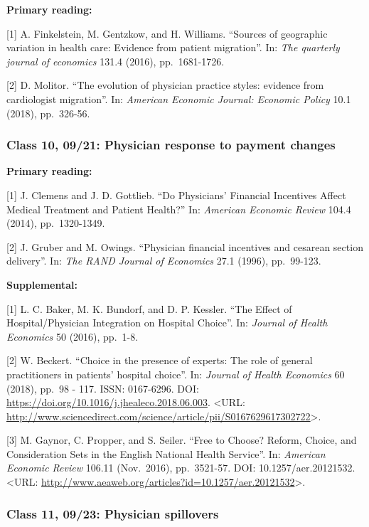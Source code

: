 \documentclass[11pt,]{article}
\begin{document}
\textbf{Primary reading:}

{[}1{]} A. Finkelstein, M. Gentzkow, and H. Williams. ``Sources of
geographic variation in health care: Evidence from patient migration''.
In: \emph{The quarterly journal of economics} 131.4 (2016),
pp.~1681-1726.

{[}2{]} D. Molitor. ``The evolution of physician practice styles:
evidence from cardiologist migration''. In: \emph{American Economic
Journal: Economic Policy} 10.1 (2018), pp.~326-56.

\hypertarget{class-10-0921-physician-response-to-payment-changes}{%
\subsubsection{Class 10, 09/21: Physician response to payment
changes}\label{class-10-0921-physician-response-to-payment-changes}}

\textbf{Primary reading:}

{[}1{]} J. Clemens and J. D. Gottlieb. ``Do Physicians' Financial
Incentives Affect Medical Treatment and Patient Health?'' In:
\emph{American Economic Review} 104.4 (2014), pp.~1320-1349.

{[}2{]} J. Gruber and M. Owings. ``Physician financial incentives and
cesarean section delivery''. In: \emph{The RAND Journal of Economics}
27.1 (1996), pp.~99-123.

\textbf{Supplemental:}

{[}1{]} L. C. Baker, M. K. Bundorf, and D. P. Kessler. ``The Effect of
Hospital/Physician Integration on Hospital Choice''. In: \emph{Journal
of Health Economics} 50 (2016), pp.~1-8.

{[}2{]} W. Beckert. ``Choice in the presence of experts: The role of
general practitioners in patients' hospital choice''. In: \emph{Journal
of Health Economics} 60 (2018), pp.~98 - 117. ISSN: 0167-6296. DOI:
\url{https://doi.org/10.1016/j.jhealeco.2018.06.003}. \textless URL:
\url{http://www.sciencedirect.com/science/article/pii/S0167629617302722}\textgreater.

{[}3{]} M. Gaynor, C. Propper, and S. Seiler. ``Free to Choose? Reform,
Choice, and Consideration Sets in the English National Health Service''.
In: \emph{American Economic Review} 106.11 (Nov.~2016), pp.~3521-57.
DOI: 10.1257/aer.20121532. \textless URL:
\url{http://www.aeaweb.org/articles?id=10.1257/aer.20121532}\textgreater.

\hypertarget{class-11-0923-physician-spillovers}{%
\subsubsection{Class 11, 09/23: Physician
spillovers}\label{class-11-0923-physician-spillovers}}
\end{document}
